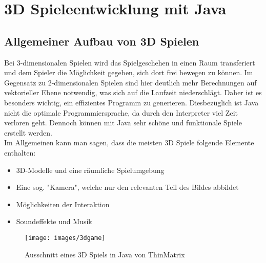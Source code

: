 \chapter{3D Spieleentwicklung mit Java}\label{ch:beispiele}

\section{Allgemeiner Aufbau von 3D Spielen}\label{sec:aufbau}

Bei 3-dimensionalen Spielen wird das Spielgeschehen in einen Raum transferiert und dem Spieler die Möglichkeit gegeben, sich dort frei bewegen zu können. \newline
Im Gegensatz zu 2-dimensionalen Spielen sind hier deutlich mehr Berechnungen auf vektorieller Ebene notwendig, was sich auf die Laufzeit niederschlägt. Daher ist es besonders wichtig, ein effizientes Programm zu generieren.
Diesbezüglich ist Java nicht die optimale Programmiersprache, da durch den Interpreter viel Zeit verloren geht. \newline
Dennoch können mit Java sehr schöne und funktionale Spiele erstellt werden.
\\
Im Allgemeinen kann man sagen, dass die meisten 3D Spiele folgende Elemente enthalten:
\begin{itemize}
	\item 3D-Modelle und eine räumliche Spielumgebung
	\item Eine sog. "Kamera", welche nur den relevanten Teil des Bildes abbildet
	\item Möglichkeiten der Interaktion
	\item Soundeffekte und Musik
\end{itemize}

\begin{figure}[h!]
		\texttt{[image: images/3dgame]}
		\caption[Beispiel eines 3D Spiels]{Ausschnitt eines 3D Spiels in Java von ThinMatrix \cite{Fig2}}
	
\end{figure}

\clearpage

